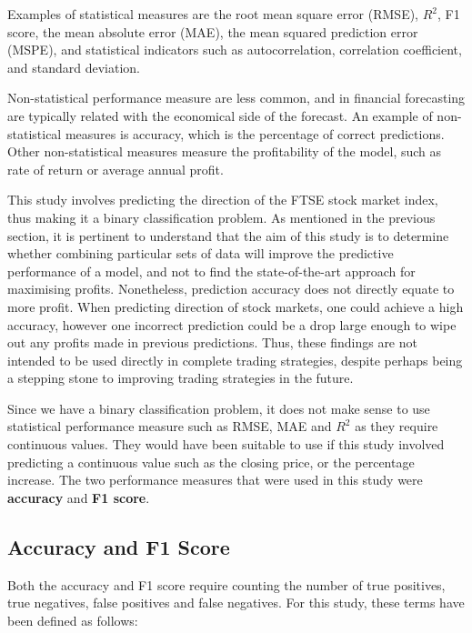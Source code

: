 \documentclass{UoYCSproject}
\begin{document}
Examples of statistical measures are the root mean square error (RMSE), $R^2$, F1 score, the mean absolute error (MAE), the mean squared prediction error (MSPE), and statistical indicators such as autocorrelation, correlation coefficient, and standard deviation. 

Non-statistical performance measure are less common, and in financial forecasting are typically related with the economical side of the forecast. An example of non-statistical measures is accuracy, which is the percentage of correct predictions. Other non-statistical measures measure the profitability of the model, such as rate of return or average annual profit.

This study involves predicting the direction of the FTSE stock market index, thus making it a binary classification problem. As mentioned in the previous section, it is pertinent to understand that the aim of this study is to determine whether combining particular sets of data will improve the predictive performance of a model, and not to find the state-of-the-art approach for maximising profits. Nonetheless, prediction accuracy does not directly equate to more profit. When predicting direction of stock markets, one could achieve a high accuracy, however one incorrect prediction could be a drop large enough to wipe out any profits made in previous predictions. Thus, these findings are not intended to be used directly in complete trading strategies, despite perhaps being a stepping stone to improving trading strategies in the future. 

Since we have a binary classification problem, it does not make sense to use statistical performance measure such as RMSE, MAE and $R^2$ as they require continuous values. They would have been suitable to use if this study involved predicting a continuous value such as the closing price, or the percentage increase. The two performance measures that were used in this study were \textbf{accuracy} and \textbf{F1 score}. 

\subsection{Accuracy and F1 Score}
\label{subsec:accuracyandf1}

Both the accuracy and F1 score require counting the number of true positives, true negatives, false positives and false negatives. For this study, these terms have been defined as follows:
\end{document}
